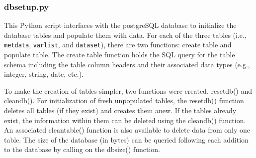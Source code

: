 \subsubsection{db\textunderscore setup.py}
\label{sec:modeldbpy}
This Python script interfaces with the postgreSQL database to initialize the database tables and populate them with data.  
For each of the three tables (i.e., \texttt{met\textunderscore data}, \texttt{var\textunderscore list}, and \texttt{data\textunderscore set}), there are two functions: create table and populate table.  
The create table function holds the SQL query for the table schema including the table column headers and their associated data types (e.g., integer, string, date, etc.).  

To make the creation of tables simpler, two functions were created, resetdb() and cleandb().  
For initialization of fresh unpopulated tables, the resetdb() function deletes all tables (if they exist) and creates them anew.  
If the tables already exist, the information within them can be deleted using the cleandb() function.  
An associated clean\textunderscore table() function is also available to delete data from only one table.  
The size of the database (in bytes) can be queried following each addition to the database by calling on the db\textunderscore size() function.

